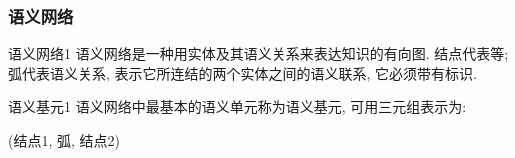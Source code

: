 \subsubsection{语义网络}
\begin{mydef}{语义网络}{1}
语义网络是一种用实体及其语义关系来表达知识的有向图.
结点代表等;
弧代表语义关系, 表示它所连结的两个实体之间的语义联系, 它必须带有标识.
\end{mydef}
\begin{mydef}{语义基元}{1}
    语义网络中最基本的语义单元称为语义基元, 可用三元组表示为:
\begin{center}
    (结点1, 弧, 结点2)
\end{center}
\end{mydef}
